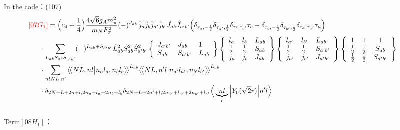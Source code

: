 \documentclass[master]{shnuthesis}
\newcommand{\llangle}{\big\langle\!\big\langle}
\newcommand{\rrangle}{\big\rangle\!\big\rangle}
\newcommand{\ap}{a^\prime}
\newcommand{\bp}{b^\prime}
\newcommand{\il}{\!\!\!\!\!\!\!\!\!\!}
\begin{document}
In the code：(107)
\begin{align}
    &\il {\color{red} [07G_1]} = \Big(c_4+\frac{1}{4}\Big)\frac{4\sqrt{6}g_A m_\pi^2}{m_N F_\pi^2} (-)^{J_{ab}}\,\hat{j}_a\hat{j}_b\hat{j}_{\ap}\hat{j}_{\bp}\hat{J}_{ab}\hat{J}_{\ap\bp} \Big( \delta_{\tau_a,-\frac{1}{2}}\delta_{\tau_{\ap},\frac{1}{2}}\delta_{\tau_b,\tau_{\bp}}\tau_b - \delta_{\tau_b,-\frac{1}{2}}\delta_{\tau_{\bp},\frac{1}{2}}\delta_{\tau_a,\tau_{\ap}}\tau_a \Big) \notag\\
    & \cdot \sum_{L_{ab}S_{ab}S_{\ap\bp}} (-)^{L_{ab}+S_{\ap\bp}} \hat{L}_{ab}^2\hat{S}_{ab}^2\hat{S}_{\ap\bp}^2  \left\{\begin{array}{lll} J_{\ap\bp} & J_{ab} & 1 \\ S_{ab} & S_{\ap\bp} & L_{ab} \end{array}\right\}  \left\{\begin{array}{lll}l_{a} & l_{b} & L_{ab} \\ \frac{1}{2} & \frac{1}{2} & S_{ab} \\j_{a} & j_{b} & J_{ab} \end{array}\right\} \left\{\begin{array}{lll}l_{\ap} & l_{\bp} & L_{ab} \\ \frac{1}{2} & \frac{1}{2} & S_{\ap\bp} \\j_{\ap} & j_{\bp} & J_{\ap\bp} \end{array}\right\}  \left\{\begin{array}{ccc} 1 & 1 & 1 \\ \frac{1}{2} & \frac{1}{2} & S_{ab} \\ \frac{1}{2} & \frac{1}{2} & S_{\ap\bp} \end{array}\right\}  \notag \\
    & \cdot \sum_{nlNL,n^\prime} \llangle N L, n l \big| n_{a} l_{a}, n_{b} l_{b} \rrangle^{L_{ab}} \llangle N L, n^\prime l \big| n_{a^\prime} l_{a^\prime}, n_{b^\prime} l_{b^\prime} \rrangle^{L_{ab}} \notag\\
    & \cdot \delta_{2N+L+2n+l,2n_a+l_a+2n_b+l_b}\delta_{2N+L+2n^\prime+l,2n_{a^\prime}+l_{a^\prime}+2n_{b^\prime}+l_{b^\prime}}  \Big\langle \underbrace{n l}_{r} \Big| Y_0(\sqrt{2}r) \Big| n^\prime l \Big\rangle
\end{align}
\,\\
{\color{red}Term$[08H_1]$：}
\end{document}
